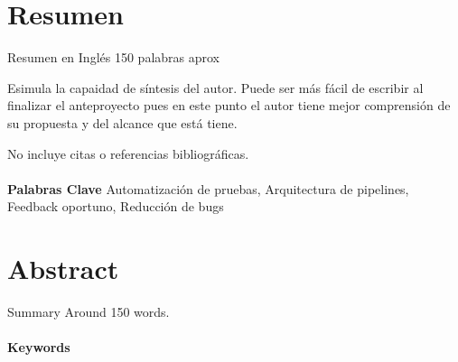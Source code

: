 
\section*{Resumen}
Resumen en Inglés
150 palabras aprox

Esimula la capaidad de síntesis del autor. Puede ser más fácil de escribir al finalizar el anteproyecto pues en este punto el autor tiene mejor comprensión de su propuesta y del alcance que está tiene. 

No incluye citas o referencias bibliográficas.


\paragraph*{}{\textbf{Palabras Clave}}
Automatización de pruebas, Arquitectura de pipelines, Feedback oportuno, Reducción de bugs
\section*{Abstract}
Summary 
Around 150 words. 
\paragraph*{}{\textbf{Keywords}}
